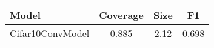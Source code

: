 \begin{table}[t] 
\centering 
\small 
\begin{tabular}{lccc} 
\toprule 
Model & Coverage & Size & F1 \\ 
\midrule 
Cifar10ConvModel & 0.885 & 2.12 & 0.698  \\ 
\bottomrule 
\end{tabular} 
\end{table} 
